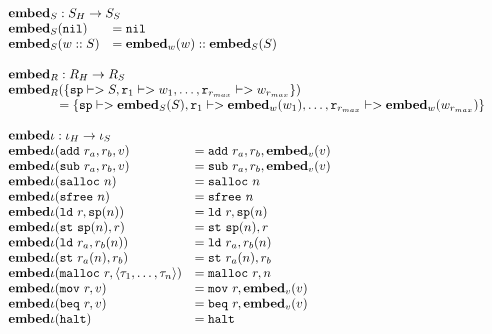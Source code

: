 {\[\begin{array}{l}
\begin{array}{ll}
\rlap{$\embed_S : \high S -> \simple{S}$} \\
\embed_S(\mathtt{nil}) &= \mathtt{nil} \\
\embed_S(w :: S) &= \embed_w(w) :: \embed_S(S) \\
\end{array} \\\\

\begin{array}{l}
\embed_R : \high R -> \simple{R} \\
\embed_R(\{\mathtt{sp} |-> S, \mathtt{r}_1 |-> w_1, \dots, \mathtt{r}_{r_{max}} |-> w_{r_{max}}\})\\
\quad\quad\quad\quad = \{\mathtt{sp} |-> \embed_S(S), \mathtt{r}_1 |-> \embed_w(w_1), \dots, \mathtt{r}_{r_{max}} |-> \embed_w(w_{r_{max}})\}
\end{array} \\\\

\begin{array}{ll}
\rlap{$\embed{\iota} : \high\iota -> \simple\iota$} \\
\embed{\iota}(\mathtt{add}\ r_a, r_b, v) &= \mathtt{add}\ r_a, r_b, \embed_v(v) \\
\embed{\iota}(\mathtt{sub}\ r_a, r_b, v) &= \mathtt{sub}\ r_a, r_b, \embed_v(v) \\
\embed{\iota}(\mathtt{salloc}\ n) &= \mathtt{salloc}\ n \\
\embed{\iota}(\mathtt{sfree}\ n) &= \mathtt{sfree}\ n \\
\embed{\iota}(\mathtt{ld}\ r, \mathtt{sp}(n)) &= \mathtt{ld}\ r, \mathtt{sp}(n) \\
\embed{\iota}(\mathtt{st}\ \mathtt{sp}(n), r) &= \mathtt{st}\ \mathtt{sp}(n), r \\
\embed{\iota}(\mathtt{ld}\ r_a, r_b(n)) &= \mathtt{ld}\ r_a, r_b(n) \\
\embed{\iota}(\mathtt{st}\ r_a(n), r_b) &= \mathtt{st}\ r_a(n), r_b \\
\embed{\iota}(\mathtt{malloc}\ r, \langle \tau_1, \dots, \tau_n \rangle) &= \mathtt{malloc}\ r, n \\
\embed{\iota}(\mathtt{mov}\ r, v) &= \mathtt{mov}\ r, \embed_v(v) \\
\embed{\iota}(\mathtt{beq}\ r, v) &= \mathtt{beq}\ r, \embed_v(v) \\
\embed{\iota}(\mathtt{halt}) &= \mathtt{halt} \\
\end{array} \\\\


\end{array}\]}
